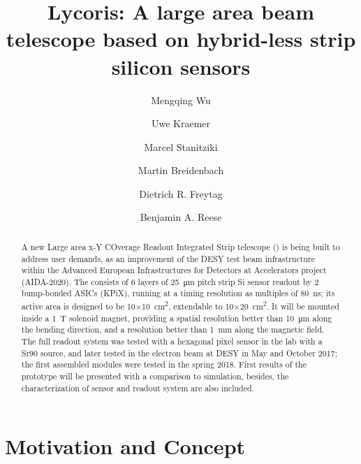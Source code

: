 



\title{{\sc Lycoris}{\bf : A large area beam telescope based on hybrid-less strip silicon sensors}}
\author[*]{Mengqing Wu}
\author[*]{Uwe Kraemer}
\author[*]{Marcel Stanitziki}
\author[**]{Martin Breidenbach}
\author[**]{Dietrich R. Freytag}
\author[**]{Benjamin A. Reese}

\maketitle

\begin{abstract}

A new Large area x-Y COverage Readout Integrated Strip telescope (\lycoris) is being built to address user demands,
as an improvement of the DESY test beam infrastructure within the Advanced European Infrastructures for Detectors at Accelerators project (AIDA-2020).
The \lycoris consists of 6 layers of \SI{25}{\micro\metre} pitch strip Si sensor readout by 2 bump-bonded ASICs (KPiX),
running at a timing resolution as multiples of \SI{80}{\nano\second};
its active area is designed to be 10$\times$\SI{10}{\square\centi\metre}, extendable to 10$\times$\SI{20}{\square\centi\metre}.
It will be mounted inside a \SI{1}{\tesla} solenoid magnet,
providing a spatial resolution better than \SI{10}{\micro\metre} along the bending direction,
and a resolution better than \SI{1}{\milli\metre} along the magnetic field.
The full readout system was tested with a hexagonal pixel sensor in the lab with a Sr90 source,
and later tested in the electron beam at DESY in May and October 2017;
the first assembled modules were tested in the spring 2018.
First results of the \lycoris prototype will be presented with a comparison to simulation,
besides, the characterization of sensor and readout system are also included.
\end{abstract}

\section*{Motivation and Concept}

